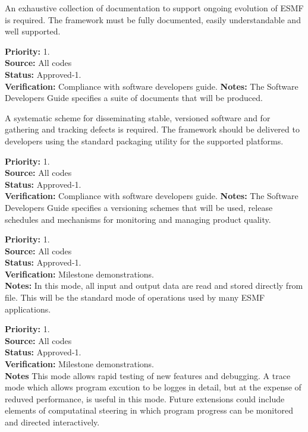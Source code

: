  An exhaustive collection of documentation
to support ongoing evolution of ESMF is required. The framework must be 
fully documented, easily understandable and well supported.
\begin{reqlist}
{\bf Priority:} 1. \\
{\bf Source:} All codes\\
{\bf Status:} Approved-1. \\
{\bf Verification:} Compliance with software developers guide.
{\bf Notes:} The Software Developers Guide specifies a suite of documents 
that will be produced.
\end{reqlist}

 A systematic scheme for disseminating
stable, versioned software and for gathering and tracking defects is required.
The framework should be delivered to developers using the standard packaging
utility for the supported platforms.
\begin{reqlist}
{\bf Priority:} 1. \\
{\bf Source:} All codes\\
{\bf Status:} Approved-1. \\
{\bf Verification:} Compliance with software developers guide.
{\bf Notes:} The Software Developers Guide specifies a versioning
schemes that will be used, release schedules and mechanisms for monitoring
and managing product quality.
\end{reqlist}

\begin{reqlist}
{\bf Priority:} 1. \\
{\bf Source:} All codes\\
{\bf Status:} Approved-1. \\
{\bf Verification:} Milestone demonstrations.\\
{\bf Notes:} In this mode, all input and output data are read and stored
directly from file. This will be the standard mode of operations used by
many ESMF applications.
\end{reqlist}

\begin{reqlist}
{\bf Priority:} 1. \\
{\bf Source:} All codes\\
{\bf Status:} Approved-1. \\
{\bf Verification:} Milestone demonstrations.\\
{\bf Notes} This mode allows rapid testing of new features and debugging.
A trace mode which allows program excution to be logges in detail,
but at the expense of reduved performance, is useful in this mode.
Future extensions could include elements of computatinal steering
in which program progress can be monitored and directed
interactively.
\end{reqlist}

